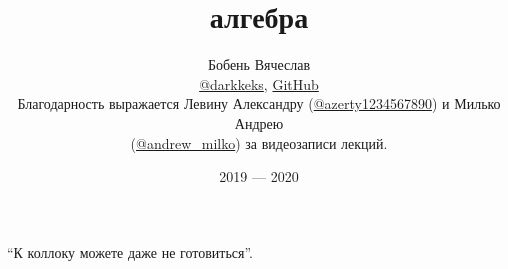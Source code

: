 \documentclass[a4paper]{article}
\title{\HugeЛинейная алгебра}
\author{
	Бобень Вячеслав \\
	\href{https://teleg.run/darkkeks}{@darkkeks},
    \href{https://github.com/LoDThe/hse-tex}{GitHub} \\
    Благодарность выражается Левину Александру (\href{https://teleg.run/azerty1234567890}{@azerty1234567890}) и Милько Андрею \\
    (\href{https://teleg.run/andrew_milko}{@andrew\_milko}) за видеозаписи лекций.
}
\date{2019 --- 2020}
\begin{document}
    \maketitle

    \epigraph{
        ``К коллоку можете даже не готовиться''.
    }{}

    \tableofcontents

    \newpage

    
    
    
    
    
    
    
    
    
    
    
    
    
    
    
    
    
    
    
    
    
    
    
    
    
    
    
    
    
\end{document}
